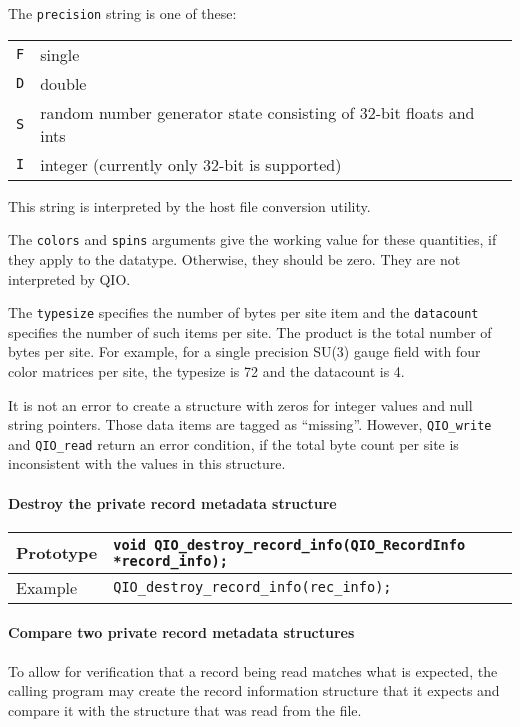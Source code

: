 \documentclass{article}
\begin{document}
The \verb|precision| string is one of these:
%
\begin{flushleft}
  \begin{tabular}{|l|l|}
\hline
    \verb|F| & single \\
    \verb|D| & double \\
    \verb|S| & random number generator state consisting of 32-bit floats and ints \\
    \verb|I| & integer (currently only 32-bit is supported)\\
\hline
  \end{tabular}
\end{flushleft}
%
This string is interpreted by the host file conversion utility.

The \verb|colors| and \verb|spins| arguments give the working value
for these quantities, if they apply to the datatype.  Otherwise, they
should be zero.  They are not interpreted by QIO\@.

The \verb|typesize| specifies the number of bytes per site item and
the \verb|datacount| specifies the number of such items per site.  The
product is the total number of bytes per site.  For example, for a
single precision SU(3) gauge field with four color matrices per site,
the typesize is 72 and the datacount is 4.

It is not an error to create a structure with zeros for integer values
and null string pointers.  Those data items are tagged as ``missing''.
However, \verb|QIO_write| and \verb|QIO_read| return an error
condition, if the total byte count per site is inconsistent with the
values in this structure.

\paragraph{Destroy the private record metadata structure}
%
\begin{flushleft}
  \begin{tabular}{|l|l|}
  \hline
  Prototype      & \verb|void QIO_destroy_record_info(QIO_RecordInfo *record_info);| \\
\hline
  Example  & \verb|QIO_destroy_record_info(rec_info);|\\
   \hline
 \end{tabular}
\end{flushleft}
%

\paragraph{Compare two private record metadata structures}
To allow for verification that a record being read matches what is
expected, the calling program may create the record information
structure that it expects and compare it with the structure that
was read from the file.
\end{document}
